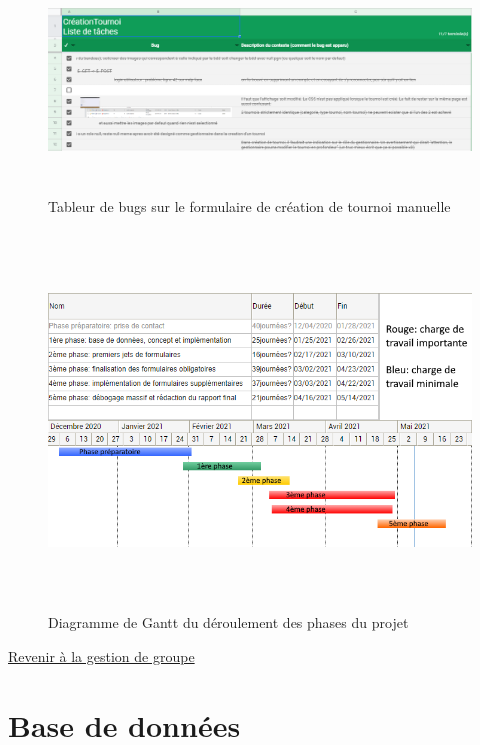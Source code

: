 \documentclass[12pt]{report}
\begin{document}
	    \begin{figure}[!h]
			\centering
				\includegraphics[height=6cm]{figures/bdd-rapport-4.PNG}
			\caption{Tableur de bugs sur le formulaire de création de tournoi manuelle}
		\end{figure}
	    \begin{figure}[!h]
			\centering
				\includegraphics[height=10cm]{figures/bdd-rapport-gantt.png}
			\caption{Diagramme de Gantt du déroulement des phases du projet}
		\end{figure}
		\newpage
		\hyperlink{bdd-retour-gestion}{Revenir à la gestion de groupe}
		
	    \newpage
        \section {Base de données}
 
	    \hypertarget{annexe-bdd-tableref}{}
	    
\end{document}
